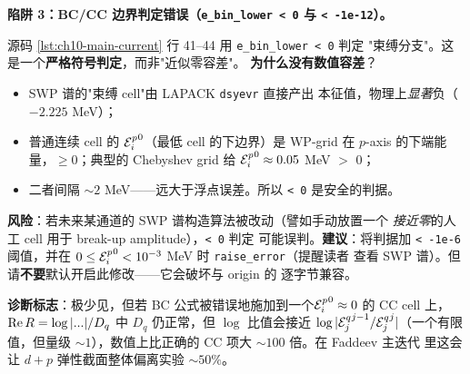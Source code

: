 \begin{pitfallbox}[label=box:ch10-pitfall-RQ-boundary]
\textbf{陷阱 3：BC/CC 边界判定错误（\texttt{e\_bin\_lower < 0} 与
\texttt{< -1e-12}）。}

源码 \cref{lst:ch10-main-current} 行 41--44 用 \texttt{e\_bin\_lower < 0} 判定
"束缚分支"。这是一个\textbf{严格符号判定}，而非"近似零容差"。
\textbf{为什么没有数值容差}？

\begin{itemize}
  \item SWP 谱的"束缚 cell"由 LAPACK \texttt{dsyevr} 直接产出
        本征值，物理上\emph{显著}负（\(-2.225\) MeV）；
  \item 普通连续 cell 的 \({\mathcal{E}_{i}^{p}}^{0}\)（最低 cell 的下边界）是
        WP-grid 在 \(p\)-axis 的下端能量，\(\geq 0\)；典型的
        Chebyshev grid 给 \({\mathcal{E}_{i}^{p}}^{0} \approx 0.05\) MeV \(>\) 0；
  \item 二者间隔 \(\sim 2\) MeV——远大于浮点误差。所以 \texttt{< 0}
        是安全的判据。
\end{itemize}

\textbf{风险}：若未来某通道的 SWP 谱构造算法被改动（譬如手动放置一个
\emph{接近零}的人工 cell 用于 break-up amplitude），\texttt{< 0} 判定
可能误判。\textbf{建议}：将判据加 \texttt{< -1e-6} 阈值，并在
\(0 \leq {\mathcal{E}_{i}^{p}}^{0} < 10^{-3}\) MeV 时 \texttt{raise\_error}（提醒读者
查看 SWP 谱）。但请\textbf{不要}默认开启此修改——它会破坏与 origin 的
逐字节兼容。

\textbf{诊断标志}：极少见，但若 BC 公式被错误地施加到一个\({\mathcal{E}_{i}^{p}}^{0} \approx
0\) 的 CC cell 上，\(\operatorname{Re} R = \log|...|/D_q\) 中 \(D_q\) 仍正常，但 \(\log\)
比值会接近 \(\log|{\mathcal{E}_{j}^{q}}^{j-1}/{\mathcal{E}_{j}^{q}}^{j}|\)（一个有限值，但量级
\(\sim 1\)），数值上比正确的 CC 项大 \(\sim 100\) 倍。在 Faddeev 主迭代
里这会让 \(d+p\) 弹性截面整体偏离实验 \(\sim 50\%\)。
\end{pitfallbox}

